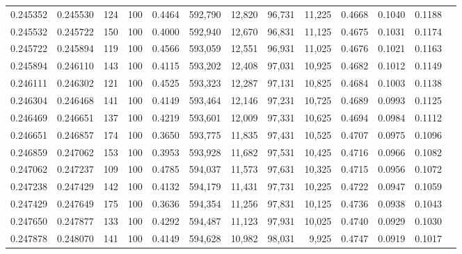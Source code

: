 \begin{tabular}{rrrrrrrrrrrrr}
0.245352 & 0.245530 &   124 & 100 &                                     0.4464 & 592,790 &  12,820 &  96,731 &  11,225 & 0.4668 & 0.1040 & 0.1188 \\
0.245532 & 0.245722 &   150 & 100 &                                     0.4000 & 592,940 &  12,670 &  96,831 &  11,125 & 0.4675 & 0.1031 & 0.1174 \\
0.245722 & 0.245894 &   119 & 100 &                                     0.4566 & 593,059 &  12,551 &  96,931 &  11,025 & 0.4676 & 0.1021 & 0.1163 \\
0.245894 & 0.246110 &   143 & 100 &                                     0.4115 & 593,202 &  12,408 &  97,031 &  10,925 & 0.4682 & 0.1012 & 0.1149 \\
0.246111 & 0.246302 &   121 & 100 &                                     0.4525 & 593,323 &  12,287 &  97,131 &  10,825 & 0.4684 & 0.1003 & 0.1138 \\
0.246304 & 0.246468 &   141 & 100 &                                     0.4149 & 593,464 &  12,146 &  97,231 &  10,725 & 0.4689 & 0.0993 & 0.1125 \\
0.246469 & 0.246651 &   137 & 100 &                                     0.4219 & 593,601 &  12,009 &  97,331 &  10,625 & 0.4694 & 0.0984 & 0.1112 \\
0.246651 & 0.246857 &   174 & 100 &                                     0.3650 & 593,775 &  11,835 &  97,431 &  10,525 & 0.4707 & 0.0975 & 0.1096 \\
0.246859 & 0.247062 &   153 & 100 &                                     0.3953 & 593,928 &  11,682 &  97,531 &  10,425 & 0.4716 & 0.0966 & 0.1082 \\
0.247062 & 0.247237 &   109 & 100 &                                     0.4785 & 594,037 &  11,573 &  97,631 &  10,325 & 0.4715 & 0.0956 & 0.1072 \\
0.247238 & 0.247429 &   142 & 100 &                                     0.4132 & 594,179 &  11,431 &  97,731 &  10,225 & 0.4722 & 0.0947 & 0.1059 \\
0.247429 & 0.247649 &   175 & 100 &                                     0.3636 & 594,354 &  11,256 &  97,831 &  10,125 & 0.4736 & 0.0938 & 0.1043 \\
0.247650 & 0.247877 &   133 & 100 &                                     0.4292 & 594,487 &  11,123 &  97,931 &  10,025 & 0.4740 & 0.0929 & 0.1030 \\
0.247878 & 0.248070 &   141 & 100 &                                     0.4149 & 594,628 &  10,982 &  98,031 &   9,925 & 0.4747 & 0.0919 & 0.1017 \\

\end{tabular}
